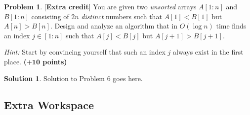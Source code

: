 \documentclass{article}
\theoremstyle{definition}
\newtheorem{problem}{Problem}
\newtheorem*{solution*}{Solution}
\newenvironment{solution}{\begin{solution*}}{{} \end{solution*}}
\newcommand{\grade}[1]{\hfill{\textbf{($\mathbf{#1}$ points)}}}
\begin{document}
\newpage

\begin{problem}\label{extra}[\textbf{Extra credit}]
	You are given two \emph{unsorted} arrays $A[1:n]$ and $B[1:n]$ consisting of $2n$ \emph{distinct} numbers such that $A[1] < B[1]$ but $A[n] > B[n]$. Design and analyze an algorithm that in $O(\log{n})$ time 
	finds an index $j \in [1:n]$ such that $A[j] < B[j]$ but $A[j+1] > B[j+1]$. 
	
	\emph{Hint:} Start by convincing yourself that such an index $j$ always exist in the first place. \grade{+10}

\end{problem}

\bigskip

			\begin{solution}
	Solution to Problem 6 goes here. 
	\end{solution}
	
\newpage
\subsection*{Extra Workspace}
\end{document}
